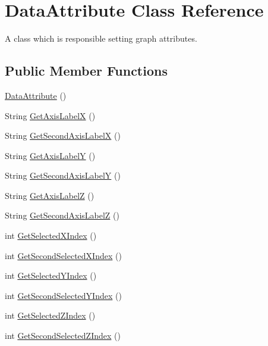 \hypertarget{class_data_attribute}{\section{Data\-Attribute Class Reference}
\label{class_data_attribute}
}


A class which is responsible setting graph attributes.  


\subsection*{Public Member Functions}
\begin{DoxyCompactItemize}
\item 
\hyperlink{class_data_attribute_a1a29077565a68ace7830697014c898d1}{Data\-Attribute} ()
\item 
String \hyperlink{class_data_attribute_aecb451704a87d77dd80dbad8a19099d1}{Get\-Axis\-Label\-X} ()
\item 
String \hyperlink{class_data_attribute_a8ace4cb1fee9e2abeabe3efc9a190c8f}{Get\-Second\-Axis\-Label\-X} ()
\item 
String \hyperlink{class_data_attribute_af5f68794cd0195d42135d5e48120ccc0}{Get\-Axis\-Label\-Y} ()
\item 
String \hyperlink{class_data_attribute_a6efb7e067317898feefbbf6bd472b998}{Get\-Second\-Axis\-Label\-Y} ()
\item 
String \hyperlink{class_data_attribute_a3929d342c387dfa768fce881e2615a83}{Get\-Axis\-Label\-Z} ()
\item 
String \hyperlink{class_data_attribute_a6ae098a5fdf2a8bd532067f2e5016540}{Get\-Second\-Axis\-Label\-Z} ()
\item 
int \hyperlink{class_data_attribute_a0f4a54973bc44b0526f78bda945dc81b}{Get\-Selected\-X\-Index} ()
\item 
int \hyperlink{class_data_attribute_a7f501790eee650ddf9ac17c4f63a3995}{Get\-Second\-Selected\-X\-Index} ()
\item 
int \hyperlink{class_data_attribute_a82e7519853d9f470ea183dd0c39a03d6}{Get\-Selected\-Y\-Index} ()
\item 
int \hyperlink{class_data_attribute_a6f61ad05915f4aa31ad3dba00596da64}{Get\-Second\-Selected\-Y\-Index} ()
\item 
int \hyperlink{class_data_attribute_a802ca8ea739cff583380ea27647250c7}{Get\-Selected\-Z\-Index} ()
\item 
int \hyperlink{class_data_attribute_ab8aad538c86b04b4b9a962b7e07e6bc3}{Get\-Second\-Selected\-Z\-Index} ()

\end{DoxyCompactItemize}
